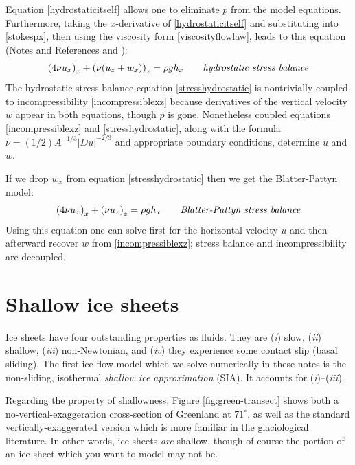 \documentclass[letterpaper,final,12pt,reqno]{amsart}
\begin{document}
Equation \eqref{hydrostaticitself} allows one to eliminate $p$ from the model equations.  Furthermore, taking the $x$-derivative of \eqref{hydrostaticitself} and substituting into \eqref{stokespx}, then using the viscosity form \eqref{viscosityflowlaw}, leads to this equation (Notes and References and \cite{GreveBlatter2009}):
\begin{equation}
\left(4 \nu u_x\right)_x + \left(\nu (u_z+w_x)\right)_z = \rho g h_x \qquad\text{\emph{hydrostatic stress balance}} \label{stresshydrostatic}
\end{equation}
The hydrostatic stress balance equation \eqref{stresshydrostatic} is nontrivially-coupled to incompressibility \eqref{incompressiblexz} because derivatives of the vertical velocity $w$ appear in both equations, though $p$ is gone.  Nonetheless coupled equations \eqref{incompressiblexz} and \eqref{stresshydrostatic}, along with the formula $\nu = (1/2) A^{-1/3} |Du|^{-2/3}$ and appropriate boundary conditions, determine $u$ and $w$.

If we drop $w_x$ from equation \eqref{stresshydrostatic} then we get the Blatter-Pattyn model:
\begin{equation}
\left(4 \nu u_x\right)_x + \left(\nu u_z\right)_z = \rho g h_x \qquad\text{\emph{Blatter-Pattyn stress balance}} \label{stressblatter}
\end{equation}
Using this equation one can solve first for the horizontal velocity $u$ and then afterward recover $w$ from \eqref{incompressiblexz}; stress balance and incompressibility are decoupled.


\section{Shallow ice sheets}   \label{sec:sia}

Ice sheets have four outstanding properties as fluids.  They are (\emph{i}) slow, (\emph{ii}) shallow,  (\emph{iii}) non-Newtonian, and (\emph{iv}) they experience some contact slip (basal sliding).  The first ice flow model which we solve numerically in these notes is the non-sliding, isothermal \emph{shallow ice approximation} (SIA).  It accounts for (\emph{i})--(\emph{iii}).

Regarding the property of shallowness, Figure \ref{fig:green-transect} shows both a no-vertical-exaggeration cross-section of Greenland at $71^\circ$, as well as the standard vertically-exaggerated version which is more familiar in the glaciological literature.  In other words, ice sheets \emph{are} shallow, though of course the portion of an ice sheet which you want to model may not be.
\end{document}
